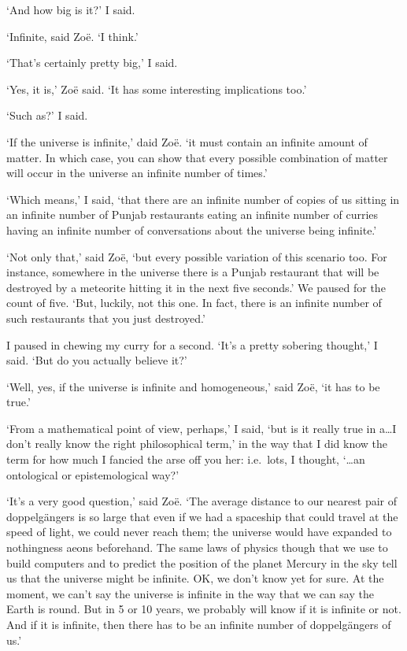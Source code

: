 `And how big is it?' I said.

`Infinite, said Zoë. `I think.'

`That's certainly pretty big,' I said.

`Yes, it is,' Zoë said. `It has some interesting
implications too.'

`Such as?' I said.

`If the universe is infinite,' daid Zoë. `it must contain
an infinite amount of matter. In which case, you can show that every
possible combination of matter will occur in the universe an
infinite number of times.'

`Which means,' I said, `that there are an infinite number of copies
of us sitting in an infinite number of Punjab restaurants eating an
infinite number of curries having an infinite number of
conversations about the universe being infinite.'

`Not only that,' said Zoë, `but every possible variation of
this scenario too. For instance, somewhere in the universe there is
a Punjab restaurant that will be destroyed by a meteorite hitting it
in the next five seconds.' We paused for the count of five. `But,
luckily, not this one. In fact, there is an
infinite number of such restaurants that you just destroyed.'

I paused in chewing my curry for a second. `It's a pretty sobering
thought,' I said. `But do you actually believe it?'

`Well, yes, if the universe is infinite and homogeneous,' said
Zoë, `it has to be true.'

`From a mathematical point of view, perhaps,' I said, `but is it
really true in a\dots I don't really know the right philosophical
term,' in the way that I did know the term for how much I fancied
the arse off you her: i.e.~lots, I thought, `{\dots}an ontological or
epistemological way?'

`It's a very good question,' said Zoë. `The average distance to
our nearest pair of doppelgängers is so large that even if we
had a spaceship that could travel at the speed of light, we could
never reach them; the universe would have expanded to nothingness
aeons beforehand. The same laws of physics though that we use to build
computers and to predict the position of the planet Mercury in the
sky tell us that the universe might be infinite. OK, we don't know
yet for sure. At the moment, we can't say the universe is infinite
in the way that we can say the Earth is round. But in 5 or 10 years,
we probably will know if it is infinite or not. And if it is
infinite, then there has to be an infinite number of
doppelgängers of us.'

